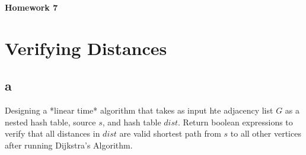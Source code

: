 \documentclass[11pt]{article}
\begin{document}
	
\begin{center}
\Large{\textbf{Homework 7}}
\end{center}

\section{Verifying Distances}
\subsection{a}
Designing a *linear time* algorithm that takes as input hte adjacency list $G$ as a nested hash table, source $s$, and hash table $dist$.
Return boolean expressions to verify that all distances in $dist$ are valid shortest path from $s$ to all other vertices after running Dijkstra's Algorithm.
\end{document}
